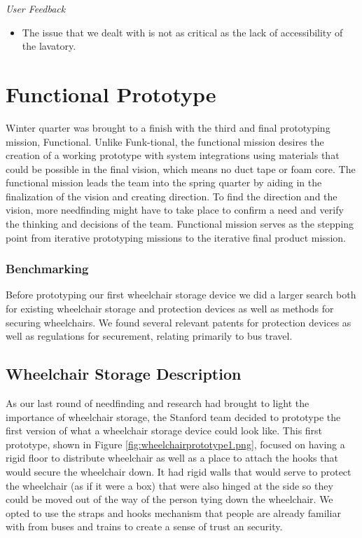 \emph{User Feedback}
\begin{itemize}
	\item The issue that we dealt with is not as critical as the lack of accessibility of the lavatory.
\end{itemize}


\section{Functional Prototype}
Winter quarter was brought to a finish with the third and final prototyping mission, Functional.  Unlike Funk-tional, the functional mission desires the creation of a working prototype with system integrations using materials that could be possible in the final vision, which means no duct tape or foam core. The functional mission leads the team into the spring quarter by aiding in the finalization of the vision and creating direction.  To find the direction and the vision, more needfinding might have to take place to confirm a need and verify the thinking and decisions of the team. Functional mission serves as the stepping point from iterative prototyping missions to the iterative final product mission.

\subsubsection{Benchmarking}
Before prototyping our first wheelchair storage device we did a larger search both for existing wheelchair storage and protection devices as well as methods for securing wheelchairs. We found several relevant patents for protection devices as well as regulations for securement, relating primarily to bus travel.



\subsection{Wheelchair Storage Description}

As our last round of needfinding and research had brought to light the importance of wheelchair storage, the Stanford team decided to prototype the first version of what a wheelchair storage device could look like. This first prototype, shown in 
Figure \ref{fig:wheelchairprototype1.png}, focused on having a rigid floor to distribute wheelchair as well as a place to attach the hooks that would secure the wheelchair down. It had rigid walls that would serve to protect the wheelchair (as if it were a box) that were also hinged at the side so they could be moved out of the way of the person tying down the wheelchair. We opted to use the straps and hooks mechanism that people are already familiar with from buses and trains to create a sense of trust an security. 

